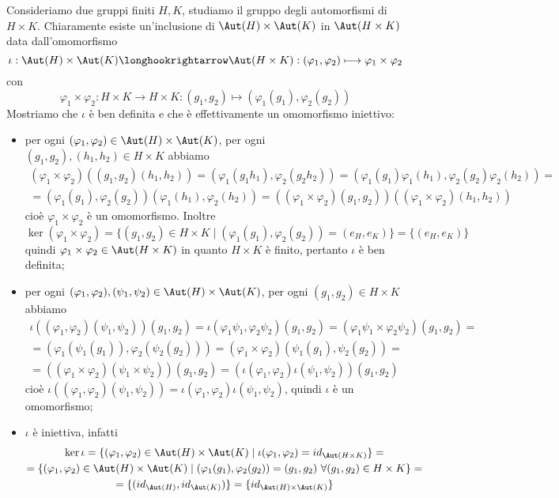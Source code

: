 \documentclass[11pt]{scrartcl}
\begin{document}
Consideriamo due gruppi finiti $H, K$, studiamo il gruppo degli automorfismi 
di $H\times K$. Chiaramente esiste un'inclusione di $\Aut(H)\times \Aut(K)$ in 
$\Aut(H\times K)$ data dall'omomorfismo 
\[
    \iota: \Aut(H)\times \Aut(K)\longhookrightarrow \Aut(H\times K) :
    (\varphi_1, \varphi_2)\longmapsto \varphi_1\times \varphi_2
\]con 
\[
    \varphi_1\times\varphi_2: H\times K \longrightarrow H\times K:
    (g_1, g_2)\longmapsto (\varphi_1(g_1), \varphi_2(g_2))
\]
Mostriamo che $\iota$ è ben definita e che è effettivamente un omomorfismo iniettivo:
\begin{itemize}
    \item per ogni $(\varphi_1, \varphi_2)\in \Aut(H)\times \Aut(K)$, per ogni
     $(g_1, g_2), (h_1, h_2)\in H\times K$ abbiamo 
     \begin{multline*}
        (\varphi_1\times\varphi_2)((g_1, g_2)(h_1, h_2)) = 
        (\varphi_1(g_1h_1), \varphi_2(g_2h_2)) = 
        (\varphi_1(g_1)\varphi_1(h_1), \varphi_2(g_2)\varphi_2(h_2)) = \\
        =(\varphi_1(g_1), \varphi_2(g_2))(\varphi_1(h_1),\varphi_2(h_2)) = 
        ((\varphi_1\times\varphi_2)(g_1, g_2))((\varphi_1\times\varphi_2)(h_1,h_2))
     \end{multline*}
     cioè $\varphi_1\times\varphi_2$ è un omomorfismo. Inoltre 
    \[
        \ker (\varphi_1\times\varphi_2) = \{(g_1, g_2) \in H\times K\mid 
        (\varphi_1(g_1), \varphi_2(g_2)) = (e_H, e_K)\} = \{(e_H, e_K)\}
    \]
    quindi $\varphi_1\times \varphi_2 \in \Aut(H\times K)$
    in quanto $H\times K$ è finito, pertanto $\iota$ è ben definita;
    \item per ogni $(\varphi_1, \varphi_2), (\psi_1, \psi_2) \in \Aut(H)\times \Aut(K)$,
    per ogni $(g_1, g_2) \in H\times K$ abbiamo 
    \begin{multline*}
        \iota((\varphi_1, \varphi_2)(\psi_1, \psi_2))(g_1, g_2) = 
        \iota(\varphi_1\psi_1, \varphi_2\psi_2)(g_1, g_2) = 
        (\varphi_1\psi_1\times\varphi_2\psi_2)(g_1, g_2) =\\
        = (\varphi_1(\psi_1(g_1)), \varphi_2(\psi_2(g_2))) = 
        (\varphi_1\times\varphi_2)(\psi_1(g_1), \psi_2(g_2)) = \\
        = ((\varphi_1\times\varphi_2)(\psi_1\times\psi_2))(g_1, g_2) = 
        (\iota(\varphi_1, \varphi_2)\iota(\psi_1,\psi_2))(g_1, g_2)
    \end{multline*}cioè $\iota((\varphi_1, \varphi_2)(\psi_1, \psi_2)) = 
    \iota(\varphi_1, \varphi_2)\iota(\psi_1, \psi_2)$, quindi $\iota$ è un 
    omomorfismo;
    \item$\iota$ è iniettiva, infatti \begin{multline*}
        \ker \iota = \{(\varphi_1, \varphi_2) \in \Aut(H)\times \Aut(K) \mid
        \iota(\varphi_1, \varphi_2) = id_{\Aut(H\times K)}\} = \\
        = \{(\varphi_1, \varphi_2) \in \Aut(H)\times \Aut(K)\mid 
        (\varphi_1(g_1), \varphi_2(g_2)) = (g_1, g_2)~\forall 
        (g_1, g_2) \in H\times K\} = \\
        = \{(id_{\Aut(H)}, id_{\Aut(K)})\} = \{id_{\Aut(H)\times\Aut(K)}\}
    \end{multline*}


\end{itemize}
\end{document}

